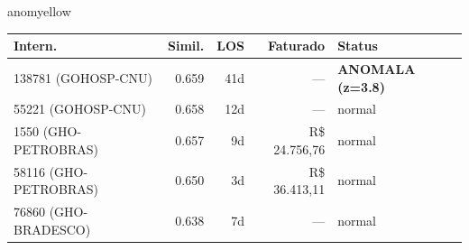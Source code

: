 \documentclass[a4paper,10pt]{article}
\begin{document}
\begin{anomalycard}[Internacao 116428 | GHO-BRADESCO | MODERADO (z=2.20)]{anomyellow}
\begin{tabular}{l r r r l}\toprule\textbf{Intern.} & \textbf{Simil.} & \textbf{LOS} & \textbf{Faturado} & \textbf{Status} \\\midrule
138781 (GOHOSP-CNU) & 0.659 & 41d & --- & \textcolor{anomred}{\textbf{ANOMALA (z=3.8)}} \\
55221 (GOHOSP-CNU) & 0.658 & 12d & --- & \textcolor{jcubeblue}{normal} \\
1550 (GHO-PETROBRAS) & 0.657 & 9d & R\$ 24.756,76 & \textcolor{jcubeblue}{normal} \\
58116 (GHO-PETROBRAS) & 0.650 & 3d & R\$ 36.413,11 & \textcolor{jcubeblue}{normal} \\
76860 (GHO-BRADESCO) & 0.638 & 7d & --- & \textcolor{jcubeblue}{normal} \\
\bottomrule\end{tabular}



\end{anomalycard}

\newpage
\end{document}
